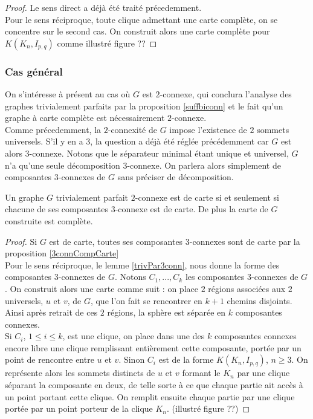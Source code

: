 \documentclass{scrartcl}
\begin{document}
\begin{flushleft}
\begin{proof}
    Le sens direct a déjà été traité précedemment.\\
    Pour le sens réciproque, toute clique admettant une carte complète, on se concentre sur le second cas. On construit
    alors une carte complète pour $K(K_n, I_{p,q})$ comme illustré figure ??
\end{proof}

\subsubsection{Cas général}

On s'intéresse à présent au cas où $G$ est $2$-connexe, qui conclura l'analyse des graphes trivialement parfaits par la proposition
\ref{suffbiconn} et le fait qu'un graphe à carte complète est nécessairement $2$-connexe.\\
Comme précedemment, la $2$-connexité de $G$ impose l'existence de $2$ sommets universels. S'il y en a $3$, la question
a déjà été réglée précédemment car $G$ est alors $3$-connexe. Notons que le séparateur minimal étant unique et universel,
$G$ n'a qu'une seule décomposition $3$-connexe. On parlera alors simplement de composantes $3$-connexes de $G$ sans préciser
de décomposition.

\begin{theorem}\label{maptrivperf}
    Un graphe $G$ trivialement parfait $2$-connexe est de carte si et seulement si chacune de ses composantes $3$-connexe est de carte.
    De plus la carte de $G$ construite est complète.
\end{theorem}

\begin{proof}
    Si $G$ est de carte, toutes ses composantes $3$-connexes sont de carte par la proposition \ref{3connCompCarte}\\
    Pour le sens réciproque, le lemme \ref{trivPar3conn}, nous donne la forme des composantes $3$-connexes de $G$.
    Notons $C_1, ..., C_k$ les composantes $3$-connexes de $G$. On construit alors une carte comme suit :
    on place $2$ régions associées aux $2$ universels, $u$ et $v$, de $G$, que l'on fait se rencontrer en $k+1$ chemins disjoints.
    Ainsi après retrait de ces $2$ régions, la sphère est séparée en $k$ composantes connexes.\\
    Si $C_i$, $1 \leq i \leq k$, est une clique, on place dans une des $k$ composantes connexes encore libre une clique
    remplissant entièrement cette composante, portée par un point de rencontre entre $u$ et $v$. Sinon $C_i$ est
    de la forme $K(K_n, I_{p,q})$, $n \geq 3$. On représente alors les sommets distincts de $u$ et $v$ formant le $K_n$
    par une clique séparant la composante en deux, de telle sorte à ce que chaque partie ait accès à un point portant
    cette clique. On remplit ensuite chaque partie par une clique portée par un point porteur de la clique $K_n$.
    (illustré figure ??)
\end{proof}


\end{flushleft}
\end{document}
